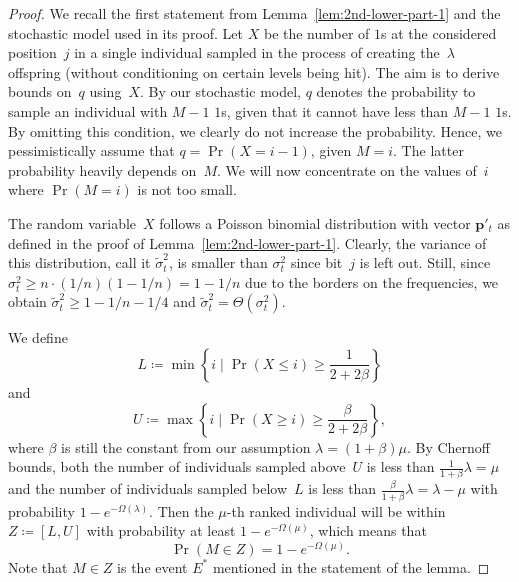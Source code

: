 \documentclass[11pt, a4paper]{article}
\DeclareMathOperator{\Prob}{Pr}
\begin{document}
\begin{proof}
We recall the first statement from Lemma~\ref{lem:2nd-lower-part-1} and the stochastic model 
used in its proof. Let $X$ be the number of $1$s at the considered position~$j$ in a single individual sampled 
		in the process of creating the~$\lambda$ offspring 
		(without conditioning on certain levels being hit). The aim is to 
		derive bounds on~$q$  using~$X$. By our stochastic model, $q$ 
		denotes the probability to sample an individual with $M-1$ $1$s, 
		given that it cannot have less than $M-1$ $1$s. By omitting this condition, we clearly do 
		not increase the probability. Hence, 
		we pessimistically assume that $q=\Prob(X=i-1)$, given $M=i$. The latter probability heavily depends 
		on~$M$. We will now concentrate on the values of~$i$ where $\Pr(M=i)$ is not 
		too small.
		
		The random variable~$X$ follows a Poisson binomial distribution with vector $\bm{p}'_t$ as defined in the proof of 
		Lemma~\ref{lem:2nd-lower-part-1}. Clearly, the variance of this distribution, call it $\tilde{\sigma}_t^2$, is smaller than $\sigma_t^2$ since 
		bit~$j$ is left out. Still, since $\sigma_t^2\ge n\cdot (1/n)(1-1/n)=1-1/n$ due to the borders on the frequencies, 
		we obtain $\tilde{\sigma}_t^2\ge 1-1/n-1/4$ and $\tilde{\sigma}_t^2 = \Theta(\sigma_t^2)$. 
		
		We define 
		\[L\coloneqq \min\left\{i\mid \Prob(X\le i)\ge \frac{1}{2+2\beta}\right\}\]
		and 
		\[U\coloneqq \max\left\{i\mid \Prob(X\ge i)\ge \frac{\beta}{2+2\beta}\right\},\]
		where $\beta$ is still the constant from our assumption $\lambda=(1+\beta)\mu$. 
		By 
		Chernoff bounds, both the 
    number of individuals sampled above~$U$ is less 
		than $\frac{1}{1+\beta}\lambda=\mu$  
		and 
    the number of individuals sampled below~$L$ 
		is  less than $\frac{\beta}{1+\beta}\lambda=\lambda-\mu$ 
		with probability $1-e^{-\Omega(\lambda)}$. 
		 Then the $\mu$-th ranked individual will be within 
    $Z\coloneqq [L,U]$ with probability at least $1-e^{-\Omega(\mu)}$, which means that 
		\begin{equation}
		\Prob(M\in Z)=1-e^{-\Omega(\mu)}. 
		\label{eq:lemma8-minz}
		\end{equation}
		Note that $M\in Z$ is the event $E^*$ mentioned in the statement of the lemma.
		

\end{proof}
\end{document}
